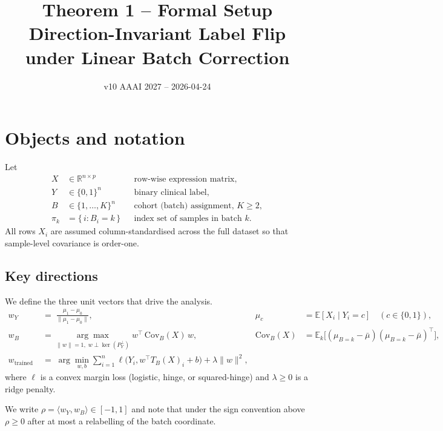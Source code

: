 \documentclass[11pt,a4paper]{article}
\title{Theorem 1 -- Formal Setup\\
 \large Direction-Invariant Label Flip under Linear Batch Correction}
\date{v10 AAAI 2027 -- 2026-04-24}
\begin{document}
\maketitle

\section{Objects and notation}

Let
\begin{align*}
  X &\in \mathbb{R}^{n\times p}          &&\text{row-wise expression matrix,}\\
  Y &\in \{0,1\}^{n}                     &&\text{binary clinical label,}\\
  B &\in \{1,\dots,K\}^{n}               &&\text{cohort (batch) assignment, }K\ge 2,\\
  \pi_{k} &= \{\,i : B_i=k\,\}           &&\text{index set of samples in batch }k.
\end{align*}
All rows $X_i$ are assumed column-standardised across the full dataset
so that sample-level covariance is order-one.

\subsection{Key directions}

We define the three unit vectors that drive the analysis.
\begin{align}
  w_Y \;&=\; \frac{\,\mu_1-\mu_0\,}{\lVert\mu_1-\mu_0\rVert},
     &\mu_c &=\mathbb{E}[X_i\mid Y_i=c] \quad (c\in\{0,1\}),
     \tag{label direction}\\[2pt]
  w_B \;&=\;
     \underset{\lVert w\rVert=1,\; w\perp \ker(P_Y^{\perp})}{\arg\max}\;
     w^{\!\top}\,\mathrm{Cov}_{\!B}(X)\,w,
     &\mathrm{Cov}_{\!B}(X) &=
     \mathbb{E}_{k}\!\bigl[(\mu_{B=k}-\bar\mu)(\mu_{B=k}-\bar\mu)^{\!\top}\bigr],
     \tag{dominant batch direction}\\[2pt]
  w_{\text{trained}} \;&=\;
     \arg\min_{w,b} \sum_{i=1}^{n}\ell\!\bigl(Y_i,w^{\!\top}T_B(X)_i+b\bigr)
     + \lambda\lVert w\rVert^{2},
     \tag{trained classifier}
\end{align}
where $\ell$ is a convex margin loss (logistic, hinge, or squared-hinge)
and $\lambda\ge 0$ is a ridge penalty.

We write $\rho = \langle w_Y, w_B\rangle \in [-1,1]$ and note that under
the sign convention above $\rho\ge 0$ after at most a relabelling of the
batch coordinate.
\end{document}
